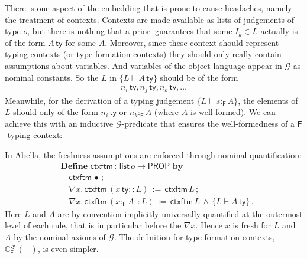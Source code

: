 \documentclass[a4paper,UKenglish]{lipics-v2016}
\newcommand{\ms}{\,}
\newcommand{\mrel}[1]{\mathrel{\ms #1 \ms}}
\newcommand{\Prop}{\ensuremath{\mathsf{PROP}}}
\newcommand{\OF}{\mrel{:}}
\newcommand{\mAnd}{\mrel{\wedge}}
\newcommand{\eqdef}{\mrel{:=}}
\newcommand{\SysF}{\ensuremath{\mathsf{F}}\xspace}
\newcommand{\ty}{\mathsf{ty}}
\newcommand{\tm}{\mathsf{tm}}
\newcommand{\istyFh}[1]{\ensuremath{#1\ms\mathsf{ty}}}
\newcommand{\typingFh}[2]{\ensuremath{#1 \mathbin{:_{\SysF}} #2}}
\newcommand{\emptyctx}{\ensuremath{\bullet}}
\begin{document}
There is one aspect of the embedding that is prone to cause headaches, namely the treatment of contexts.
Contexts are made available as lists of judgements of type $o$, but there is nothing that a priori guarantees that some $I_k \in L$ actually is of the form $\istyFh A$ for some $A$.
Moreover, since these context should represent typing contexts (or type formation contexts) they should only really contain assumptions about variables.
And variables of the object language appear in $\mathcal{G}$ as nominal constants.
So the $L$ in $\{L \vdash \istyFh{A}\}$ should be of the form
\begin{align*}
  \istyFh{n_i}, \istyFh{n_j}, \istyFh{n_k}, \ldots
\end{align*}
Meanwhile, for the derivation of a typing judgement $\{L \vdash \typingFh{s}{A}\}$, the elements of $L$ should only of the form $\istyFh{n_i}$ or $\typingFh{n_k}{A}$ (where $A$ is well-formed).
We can achieve this with an inductive $\mathcal{G}$-predicate that ensures the well-formedness of a \SysF{}-typing context:
\newcommand{\ac}[3]{\ensuremath{\mathbb{C}_{#1}^{#2}\ms (#3)}}
\newcommand{\acFty}[1]{\ac{\SysF}{\ty}{#1}}
\newcommand{\acFtm}[1]{\ac{\SysF}{\tm}{#1}}
In Abella, the freshness assumptions are enforced through nominal quantification:
\begin{align*}
  &\mathbf{Define}\ms\ms\mathsf{ctxftm} \OF \mathsf{list}\,o \to \Prop \ms\ms\mathbf{by}\\
  &\quad\mathsf{ctxftm}\ms\emptyctx\ms;\\
  &\quad\nabla x. \ms \mathsf{ctxftm}\ms (\istyFh{x} \mathbin{::} L) \eqdef \mathsf{ctxftm}\ms L \ms;\\
  &\quad\nabla x. \ms \mathsf{ctxftm}\ms (\typingFh{x}{A} \mathbin{::} L) \eqdef \mathsf{ctxftm}\ms L \mAnd \{L \vdash \istyFh{A}\}\ms.
\end{align*}
Here $L$ and $A$ are by convention implicitly universally quantified at the outermost level of each rule, that is in particular before the $\nabla x$.
Hence $x$ is fresh for $L$ and $A$ by the nominal axioms of $\mathcal{G}$.
The definition for type formation contexts, \acFty{-}, is even simpler.
\end{document}

